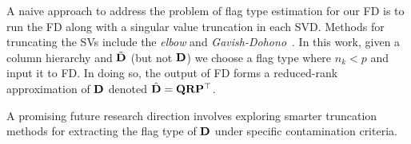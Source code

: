 A naive approach to address the problem of flag type estimation for our FD is to run the FD along with a singular value truncation in each SVD. Methods for truncating the SVs include the \emph{elbow} and \emph{Gavish-Dohono}~\cite{gavish2014optimal,falini2022review}. In this work, given a column hierarchy and $\tilde{\mathbf{D}}$ (but not $\mathbf{D}$) we choose a flag type where $n_k < p$ and input it to FD. In doing so, the output of FD forms a reduced-rank approximation of $\mathbf{D}$ denoted $\hat{\mathbf{D}} = \mathbf{Q} \mathbf{R} \mathbf{P}^\top$. 

A promising future research direction involves exploring smarter truncation methods for extracting the flag type of $\mathbf{D}$ under specific contamination criteria. 

    









